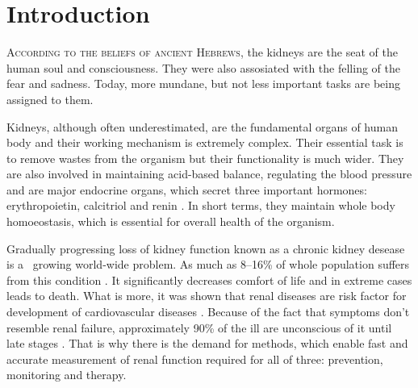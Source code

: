 	\setcounter{page}{1}
	
\fancyhead[LE,RO]{{\small{\author}}\linebreak{\small\textsl{\title}}}
\fancyhead[RE,LO]{}
\renewcommand{\headrulewidth}{1pt}
	
\chapter*{Introduction}


\lettrine[lines=3, slope=1em, findent=-0.8em]{A}{ccording to the beliefs of ancient Hebrews}, the kidneys are the seat of the human soul and consciousness. They were also assosiated with the felling of the fear and sadness\cite {maio1999metaphorical}. Today, more mundane, but not less important tasks are being assigned to them. 

Kidneys, although often underestimated, are the fundamental organs of human body and their working mechanism is extremely complex. Their essential task is to remove wastes from the organism but their functionality is much wider. They are also involved in maintaining acid-based balance, regulating the blood pressure and are major endocrine organs, which secret three important hormones: erythropoietin, calcitriol and renin \cite{saladin}. In short terms, they maintain whole body homoeostasis, which is essential for overall health of the organism. 

Gradually progressing loss of kidney function known as a chronic kidney desease is a~ growing world-wide problem. As much as 8--16\% of whole population suffers from this condition \cite{statistics}. It significantly decreases comfort of life and in extreme cases leads to death. What is more, it was shown that renal diseases are risk factor for development of cardiovascular diseases \cite{cardiovascular_diseases}.
Because of the fact that symptoms don't resemble renal failure, approximately 90\% of the ill are unconscious of it until late stages \cite{national_kidney_foundation}. That is why there is the demand for methods, which enable fast and accurate measurement of renal function required for all of three: prevention, monitoring and therapy.

